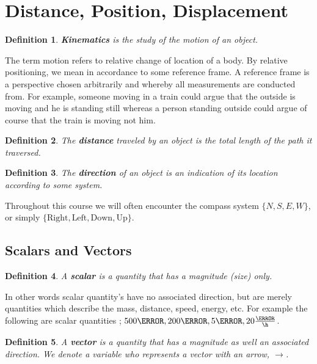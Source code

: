 \documentclass[12pt]{article}
\theoremstyle{break}
\newtheorem{defn}{Definition}[subsection]
\begin{document}
\let\ref\Cref


\section{Distance, Position, Displacement}
\begin{defn}
\textbf{Kinematics} is the study of the motion of an object.
\end{defn}
The term motion refers to relative change of location of a body. By relative positioning, we mean in accordance to some reference frame. A reference frame is a perspective chosen arbitrarily and whereby all measurements are conducted from. For example, someone moving in a train could argue that the outside is moving and he is standing still whereas a person standing outside could argue of course that the train is moving not him.
\begin{defn}
The \textbf{distance} traveled by an object is the total length of the path it traversed.
\end{defn}
\begin{defn}
The \textbf{direction} of an object is an indication of its location according to some system.
\end{defn}
Throughout this course we will often encounter the compass system $\{N, S, E, W \}$, or simply $\{\text{Right}, \text{Left}, \text{Down}, \text{Up} \}$.
\subsection{Scalars and Vectors}
\begin{defn}
A \textbf{scalar} is a quantity that has a magnitude (size) \emph{only}.
\end{defn}
In other words scalar quantity's have no associated direction, but are merely quantities which describe the mass, distance, speed, energy, etc. For example the following are scalar quantities ; $500 \m, 200 \kg, 5 \J, 20 \frac{\km}{\h}$.

\begin{defn}
A \textbf{vector} is a quantity that has a magnitude as well an associated direction. We denote a variable who represents a vector with an arrow, $\rightarrow$.
\end{defn}
\end{document}
